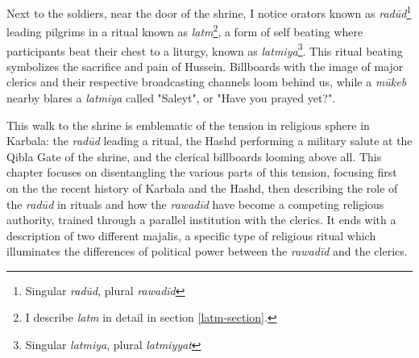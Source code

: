 Next to the soldiers, near the door of the shrine, I notice orators known as \emph{radūd}\footnote{Singular \emph{radūd}, plural \emph{rawadīd}} leading pilgrims in a ritual known as \emph{latm}\footnote{I describe \emph{latm} in detail in section \ref{latm-section}.}, a form of self beating where participants beat their chest to a liturgy, known as \emph{latmiya}\footnote{Singular \emph{latmiya}, plural \emph{latmiyyat}}. This ritual beating symbolizes the sacrifice and pain of Hussein. Billboards with the image of major clerics and their respective broadcasting channels loom behind us, while a \emph{mūkeb} nearby blares a \emph{latmiya} called "Saleyt", or "Have you prayed yet?". 


This walk to the shrine is emblematic of the tension in religious sphere in Karbala: the \emph{radūd} leading a ritual, the Hashd performing a military salute at the Qibla Gate of the shrine, and the clerical billboards looming above all. This chapter focuses on disentangling the various parts of this tension, focusing first on the the recent history of Karbala and the Hashd, then describing the role of the \emph{radūd} in rituals and how the \emph{rawadīd} have become a competing religious authority, trained through a parallel institution with the clerics. It ends with a description of two different majalis, a specific type of religious ritual which illuminates the differences of political power between the \emph{rawadīd} and the clerics. 




